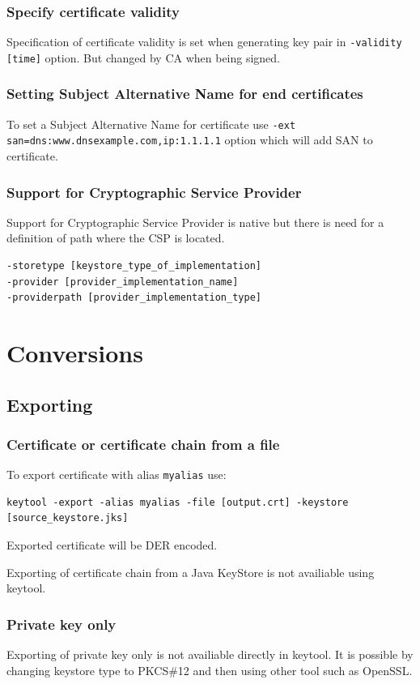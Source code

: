 \documentclass[10pt, a4paper]{report}
\begin{document}
    \subsubsection{Specify certificate validity}
Specification of certificate validity is set when generating key pair in \verb+-validity [time]+ option. But changed by CA when being signed.

    \subsubsection{Setting Subject Alternative Name for end certificates}
To set a Subject Alternative Name for certificate use \verb+-ext san=dns:www.dnsexample.com,ip:1.1.1.1+ option which will add SAN to certificate.

    \subsubsection{Support for Cryptographic Service Provider}
Support for Cryptographic Service Provider is native but there is need for a definition of path where the CSP is located.
\begin{verbatim}
-storetype [keystore_type_of_implementation]
-provider [provider_implementation_name]
-providerpath [provider_implementation_type]
\end{verbatim}

    
\section{Conversions}

  \subsection{Exporting}
  
    \subsubsection{Certificate or certificate chain from a file}
To export certificate with alias \verb+myalias+ use:
\begin{verbatim}
keytool -export -alias myalias -file [output.crt] -keystore [source_keystore.jks]
\end{verbatim}  
Exported certificate will be DER encoded.

Exporting of certificate chain from a Java KeyStore is not availiable using keytool.

    \subsubsection{Private key only}
Exporting of private key only is not availiable directly in keytool. It is possible by changing keystore type to PKCS\#12 and then using other tool such as OpenSSL.
\end{document}
